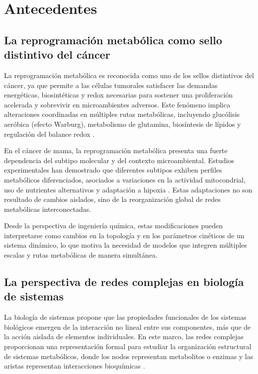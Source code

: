 \documentclass[12pt,spanish]{article}
\begin{document}
		\section{Antecedentes}
	
	\subsection{La reprogramación metabólica como sello distintivo del cáncer}
	
	La reprogramación metabólica es reconocida como uno de los sellos distintivos del cáncer, ya que permite a las células tumorales satisfacer las demandas energéticas, biosintéticas y redox necesarias para sostener una proliferación acelerada y sobrevivir en microambientes adversos. Este fenómeno implica alteraciones coordinadas en múltiples rutas metabólicas, incluyendo glucólisis aeróbica (efecto Warburg), metabolismo de glutamina, biosíntesis de lípidos y regulación del balance redox \cite{Hanahan2011,Pavlova2016}.
	
	En el cáncer de mama, la reprogramación metabólica presenta una fuerte dependencia del subtipo molecular y del contexto microambiental. Estudios experimentales han demostrado que diferentes subtipos exhiben perfiles metabólicos diferenciados, asociados a variaciones en la actividad mitocondrial, uso de nutrientes alternativos y adaptación a hipoxia \cite{Zhang2017}. Estas adaptaciones no son resultado de cambios aislados, sino de la reorganización global de redes metabólicas interconectadas.
	
	Desde la perspectiva de ingeniería química, estas modificaciones pueden interpretarse como cambios en la topología y en los parámetros cinéticos de un sistema dinámico, lo que motiva la necesidad de modelos que integren múltiples escalas y rutas metabólicas de manera simultánea.
	
	\subsection{La perspectiva de redes complejas en biología de sistemas}
	
	La biología de sistemas propone que las propiedades funcionales de los sistemas biológicos emergen de la interacción no lineal entre sus componentes, más que de la acción aislada de elementos individuales. En este marco, las redes complejas proporcionan una representación formal para estudiar la organización estructural de sistemas metabólicos, donde los nodos representan metabolitos o enzimas y las aristas representan interacciones bioquímicas \cite{Barabasi2004}.
	
\end{document}
